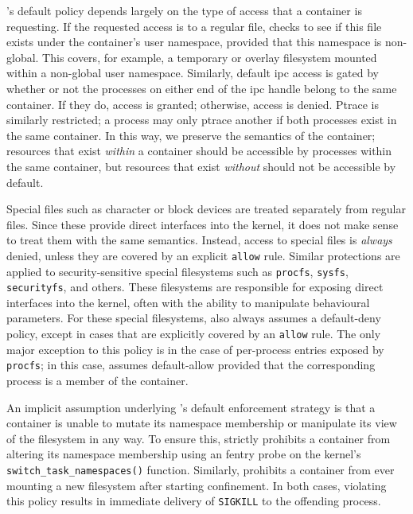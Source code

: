 \bpfcontain{}'s default policy depends largely on the type of access that a container is
requesting. If the requested access is to a regular file, \bpfcontain{} checks to see if
this file exists under the container's user namespace, provided that this namespace is
non-global. This covers, for example, a temporary or overlay filesystem mounted within
a non-global user namespace.  Similarly, default \gls{ipc} access is gated by whether or
not the processes on either end of the \gls{ipc} handle belong to the same container. If
they do, access is granted; otherwise, access is denied. Ptrace is similarly restricted;
a process may only ptrace another if both processes exist in the same container. In this
way, we preserve the semantics of the container; resources that exist \textit{within}
a container should be accessible by processes within the same container, but resources
that exist \textit{without} should not be accessible by default.

Special files such as character or block devices are treated separately from regular
files. Since these provide direct interfaces into the kernel, it does not make sense to
treat them with the same semantics. Instead, access to special files is \textit{always}
denied, unless they are covered by an explicit \texttt{allow} rule. Similar protections
are applied to security-sensitive special filesystems such as \texttt{procfs},
\texttt{sysfs}, \texttt{securityfs}, and others. These filesystems are responsible for
exposing direct interfaces into the kernel, often with the ability to manipulate
behavioural parameters. For these special filesystems, \bpfcontain{} also always assumes
a default-deny policy, except in cases that are explicitly covered by an \texttt{allow}
rule. The only major exception to this policy is in the case of per-process entries
exposed by \texttt{procfs}; in this case, \bpfcontain{} assumes default-allow provided
that the corresponding process is a member of the container.

An implicit assumption underlying \bpfcontain{}'s default enforcement strategy is that
a container is unable to mutate its namespace membership or manipulate its view of the
filesystem in any way. To ensure this, \bpfcontain{} strictly prohibits a container from
altering its namespace membership using an fentry probe on the kernel's
\texttt{switch\_task\_namespaces()} function. Similarly, \bpfcontain{} prohibits
a container from ever mounting a new filesystem after starting confinement. In both cases,
violating this policy results in immediate delivery of \texttt{SIGKILL} to the offending
process.

